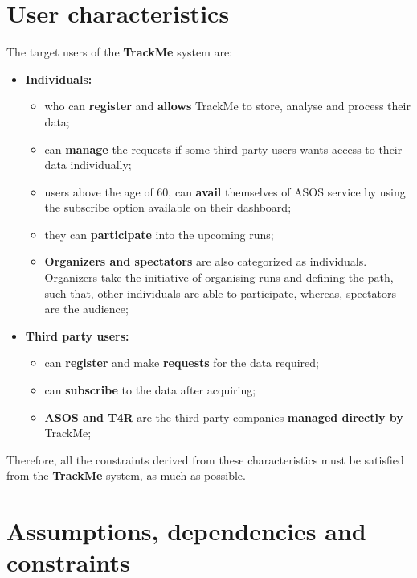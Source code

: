 \documentclass[12pt]{report}
\begin{document}
\section{User characteristics}
The target users of the \textbf{TrackMe} system are:
\begin{itemize}
\item{} \textbf{Individuals:} 
\begin{itemize}
\item{} who can \textbf{register} and \textbf{allows} TrackMe to store, analyse and process their data;
\item{} can \textbf{manage} the requests if some third party users wants access to their data individually;
\item{} users above the age of 60, can \textbf{avail} themselves of ASOS service by using the subscribe option available on their dashboard;
\item{} they can \textbf{participate} into the upcoming runs;
\item{} \textbf{Organizers and spectators} are also categorized as individuals. Organizers take the initiative of organising runs and defining the path, such that, other individuals are able to participate, whereas, spectators are the audience;

\end{itemize}
\item{} \textbf{Third party users:}
\begin{itemize}
\item{} can \textbf{register} and make \textbf{requests} for the data required;
\item{} can \textbf{subscribe} to the data after acquiring;
\item{} \textbf{ASOS and T4R} are the third party companies \textbf{managed directly by} TrackMe;
\end{itemize}
\end{itemize}

Therefore, all the constraints derived from these characteristics must be satisfied from the \textbf{TrackMe} system, as much as possible.

\section{Assumptions, dependencies and constraints}
\end{document}
